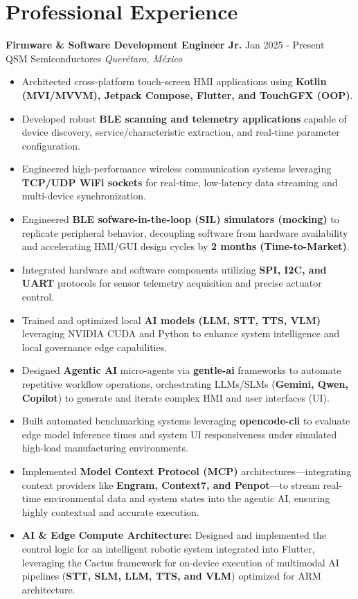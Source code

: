 \documentclass[10pt,a4paper]{article}
\newcommand{\workexp}[5]{
    \textbf{#1} \hfill #2\\
    \textcolor{primary}{#3} \hfill \textit{#4}\vspace{5pt}
    \begin{itemize}[leftmargin=*,nosep]
    #5
    \end{itemize}
    \vspace{5pt}
}
\begin{document}
\section*{Professional Experience}
\workexp{Firmware \& Software Development Engineer Jr.}{Jan 2025 - Present}{QSM Semiconductores}{Querétaro, México}{
    \item Architected cross-platform touch-screen HMI applications using \textbf{Kotlin (MVI/MVVM), Jetpack Compose, Flutter, and TouchGFX (OOP)}.
        \item Developed robust \textbf{BLE scanning and telemetry applications} capable of device discovery, service/characteristic extraction, and real-time parameter configuration.
    \item Engineered high-performance wireless communication systems leveraging \textbf{TCP/UDP WiFi sockets} for real-time, low-latency data streaming and multi-device synchronization.
    \item Engineered \textbf{BLE sofware-in-the-loop (SIL) simulators (mocking)} to replicate peripheral behavior, decoupling software from hardware availability and accelerating HMI/GUI design cycles by \textbf{2 months (Time-to-Market)}.
    \item Integrated hardware and software components utilizing \textbf{SPI, I2C, and UART} protocols for sensor telemetry acquisition and precise actuator control.
    \item Trained and optimized local \textbf{AI models (LLM, STT, TTS, VLM)} leveraging NVIDIA CUDA and Python to enhance system intelligence and local governance edge capabilities.
    \item Designed \textbf{Agentic AI} micro-agents via \textbf{gentle-ai} frameworks to automate repetitive workflow operations, orchestrating LLMs/SLMs (\textbf{Gemini, Qwen, Copilot}) to generate and iterate complex HMI and user interfaces (UI).
    \item Built automated benchmarking systems leveraging \textbf{opencode-cli} to evaluate edge model inference times and system UI responsiveness under simulated high-load manufacturing environments.
    \item Implemented \textbf{Model Context Protocol (MCP)} architectures—integrating context providers like \textbf{Engram, Context7, and Penpot}—to stream real-time environmental data and system states into the agentic AI, ensuring highly contextual and accurate execution.
        \item \textbf{AI \& Edge Compute Architecture:} Designed and implemented the control logic for an intelligent robotic system integrated into Flutter, leveraging the Cactus framework for on-device execution of multimodal AI pipelines (\textbf{STT, SLM, LLM, TTS, and VLM}) optimized for ARM architecture.
}
\end{document}
